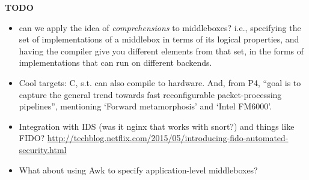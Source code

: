 \documentclass{article}
\newenvironment{todo}{\begin{mdframed}[backgroundcolor=gray!20]\bf TODO \begin{itemize}}{\end{itemize}\end{mdframed}}
\begin{document}
\begin{todo}
      Dimensions to the language:
      - Configuration
      - Data definition language: as serialisation annotations to data types.
      Support recursive types? Support subtyping? Can support subtyping via
      refinement types?
      - Semantic extensions, and fallbacks: i.e., use TCAM if available,
      otherwise use regexes. Can use similar mechanism as for DDL?
      - Core computation language
      - Being able to reason about packets, flows, and (byte)streams
      - Cost annotations (i.e., to either statically provide measure of cost
      that is universal among all backends, or to specify how a backend is to
      measure the cost) and cut-offs (i.e., if a cost is statically higher than
      a threshold, then take a particular action at compile time; and if a cost
      cannot statically be precomputed, than if a cost of dynamically higher
      than a threshold, then take a particular action at runtime.) How are we to
      bound the cost (in terms of various and possibly heterogeneous
      resources---such as use of a particular (kind of) processor, and
      particular (kind of) network interface or channel, and particular (kind
      of) memory?
\item can we apply the idea of \emph{comprehensions} to middleboxes? i.e.,
  specifying the set of implementations of a middlebox in terms of its logical
  properties, and having the compiler give you different elements from that set,
  in the forms of implementations that can run on different backends.
\item Cool targets: C, s.t. can also compile to hardware. And, from P4, ``goal
  is to capture the general trend towards fast reconfigurable packet-processing
  pipelines'', mentioning `Forward metamorphosis' and `Intel FM6000'.
\item Integration with IDS (was it nginx that works with snort?) and things like FIDO?
  \url{http://techblog.netflix.com/2015/05/introducing-fido-automated-security.html}
\item What about using Awk to specify application-level middleboxes?
\end{todo}
\end{document}
